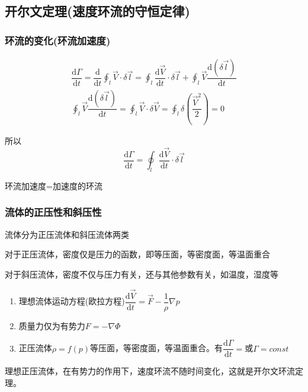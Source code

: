 \documentclass[a4paper,oneside]{ctexbook}
\begin{document}
\subsection{开尔文定理(速度环流的守恒定律)}

\subsubsection{环流的变化(环流加速度)}
\begin{gather}
    \dfrac{\mathrm{d}\Gamma}{\mathrm{d}t}=\dfrac{\mathrm{d}}{\mathrm{d}t}\oint_l\overrightarrow{V}\cdot\delta\overrightarrow{l}=\oint_l\dfrac{\mathrm{d}\overrightarrow{V}}{\mathrm{d}t}\cdot\delta\overrightarrow{l}+\oint_l\overrightarrow{V}\dfrac{\mathrm{d}(\delta\overrightarrow{l})}{\mathrm{d}t}\\
    \oint_l\overrightarrow{V}\dfrac{\mathrm{d}(\delta\overrightarrow{l})}{\mathrm{d}t}=\oint_l\overrightarrow{V}\cdot\delta\overrightarrow{V}=\oint_l\delta\left(\dfrac{\overrightarrow{V}^2}{2}\right)=0
\end{gather}

所以
\begin{equation}
    \dfrac{\mathrm{d}\Gamma}{\mathrm{d}t}=\oint_l\dfrac{\mathrm{d}\overrightarrow{V}}{\mathrm{d}t}\cdot\delta\overrightarrow{l}
\end{equation}

环流加速度=加速度的环流

\subsubsection{流体的正压性和斜压性}

流体分为正压流体和斜压流体两类

对于正压流体，密度仅是压力的函数，即等压面，等密度面，等温面重合

对于斜压流体，密度不仅与压力有关，还与其他参数有关，如温度，湿度等
\begin{enumerate}
    \item 理想流体运动方程(欧拉方程)\(\dfrac{\mathrm{d}\overrightarrow{V}}{\mathrm{d}t}=\overrightarrow{F}-\dfrac{1}{\rho}\nabla{p}\)
    \item 质量力仅为有势力\(F=-\nabla\Phi\)
    \item 正压流体\(\rho=f(p)\)等压面，等密度面，等温面重合。有\(\dfrac{\mathrm{d}\Gamma}{\mathrm{d}t}=\)或\(\Gamma=const\)
\end{enumerate}

理想正压流体，在有势力的作用下，速度环流不随时间变化，这就是开尔文环流定理。
\end{document}
